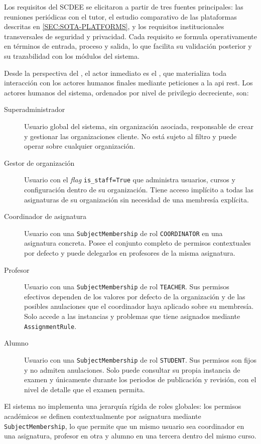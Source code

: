 Los requisitos del SCDEE se elicitaron a partir de tres fuentes principales:
las reuniones periódicas con el tutor, el estudio comparativo de las
plataformas descritas en \cref{SEC:SOTA-PLATFORMS}, y los requisitos
institucionales transversales de seguridad y privacidad. Cada requisito se
formula operativamente en términos de entrada, proceso y salida, lo que
facilita su validación posterior y su trazabilidad con los módulos del
sistema.

Desde la perspectiva del , el actor inmediato es el
, que materializa toda interacción con los actores humanos
finales mediante peticiones a la \ac{api} \ac{rest}. Los actores humanos
del sistema, ordenados por nivel de privilegio decreciente, son:

\begin{description}
  \item[Superadministrador] Usuario global del sistema, sin organización
        asociada, responsable de crear y gestionar las organizaciones
        cliente. No está sujeto al filtro  y puede operar
        sobre cualquier organización.

  \item[Gestor de organización] Usuario con el \textit{flag}
        \texttt{is\_staff=True} que administra usuarios, cursos y
        configuración dentro de su organización. Tiene acceso implícito a
        todas las asignaturas de su organización sin necesidad de una
        membresía explícita.

  \item[Coordinador de asignatura] Usuario con una
        \texttt{SubjectMembership} de rol \texttt{COORDINATOR} en una
        asignatura concreta. Posee el conjunto completo de permisos
        contextuales por defecto y puede delegarlos en profesores de la
        misma asignatura.

  \item[Profesor] Usuario con una \texttt{SubjectMembership} de rol
        \texttt{TEACHER}. Sus permisos efectivos dependen de los valores
        por defecto de la organización y de las posibles anulaciones que el
        coordinador haya aplicado sobre su membresía. Solo accede a las
        instancias y problemas que tiene asignados mediante
        \texttt{AssignmentRule}.

  \item[Alumno] Usuario con una \texttt{SubjectMembership} de rol
        \texttt{STUDENT}. Sus permisos son fijos y no admiten anulaciones.
        Solo puede consultar su propia instancia de examen y únicamente
        durante los periodos de publicación y revisión, con el nivel de
        detalle que el examen permita.
\end{description}

El sistema no implementa una jerarquía rígida de roles globales: los
permisos académicos se definen contextualmente por asignatura mediante
\texttt{SubjectMembership}, lo que permite que un mismo usuario sea
coordinador en una asignatura, profesor en otra y alumno en una tercera
dentro del mismo curso.
